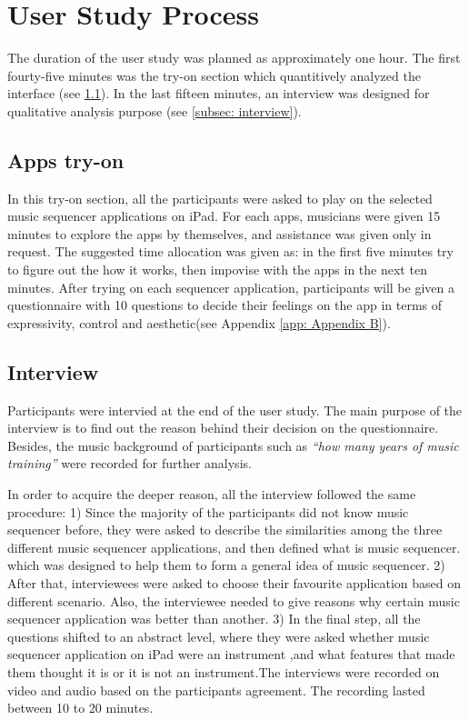 \section{User Study Process}

The duration of the user study was planned as approximately one hour. The first fourty-five minutes was the try-on section which quantitively analyzed the interface (see \ref{subsec: play on}). In the last fifteen minutes, an interview was designed for qualitative analysis purpose (see \ref{subsec: interview}).

\subsection{Apps try-on}
\label{subsec: play on}
In this try-on section, all the participants were asked to play on the selected music sequencer applications on iPad. For each apps, musicians were given 15 minutes to explore the apps by themselves, and assistance was given only in request. The suggested time allocation was given as: in the first five minutes try to figure out the how it works, then impovise with the apps in the next ten minutes. After trying on each sequencer application, participants will be given a questionnaire with 10 questions to decide their feelings on the app in terms of expressivity, control and aesthetic(see Appendix \ref{app: Appendix B}).


\subsection{Interview}
\label{{subsec: interview}}
Participants were intervied at the end of the user study. The main purpose of the interview is to find out the reason behind their decision on the questionnaire. Besides, the music background of participants such as \textit{\textquotedblleft{how many years of music training}\textquotedblright} were recorded for further analysis.

In order to acquire the deeper reason, all the interview followed the same procedure: 1) Since the majority of the participants did not know music sequencer before, they were asked to describe the similarities among the three different music sequencer applications, and then defined what is music sequencer. which was designed to help them to form a general idea of music sequencer. 2) After that, interviewees were asked to choose their favourite application based on different scenario. Also, the interviewee needed to give reasons why certain music sequencer application was better than another. 3) In the final step, all the questions shifted to an abstract level, where they were asked whether music sequencer application on iPad were an instrument ,and what features that made them thought it is or it is not an instrument.The interviews were recorded on video and audio based on the participants agreement. The recording lasted between 10 to 20 minutes.

